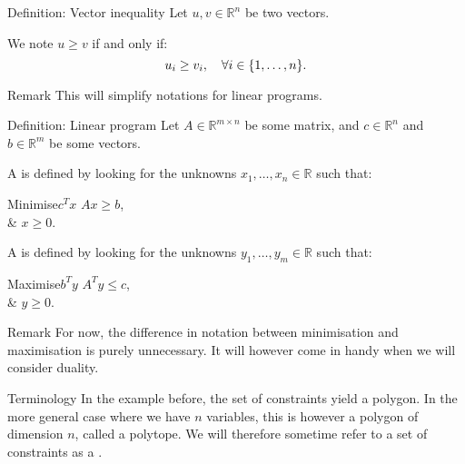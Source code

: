 \documentclass[a4paper]{article}
\begin{document}
\begin{parag}{Definition: Vector inequality}
    Let $u, v \in \mathbb{R}^n$ be two vectors.

    We note $u \geq v$ if and only if: 
    \[u_i \geq v_i, \mathspace \forall i \in \left\{1, \ldots, n\right\}.\]

    \begin{subparag}{Remark}
        This will simplify notations for linear programs.
    \end{subparag}
\end{parag}

\begin{parag}{Definition: Linear program}
    Let $A \in \mathbb{R}^{m \times n}$ be some matrix, and $c \in \mathbb{R}^{n}$ and $b \in \mathbb{R}^{m}$ be some vectors.

    A  is defined by looking for the unknowns $x_1, \ldots, x_n \in \mathbb{R}$ such that:
    \begin{linearprogram}{Minimise}{$c^T x$}
        $A x \geq b$, \\
        & $x \geq 0$.
    \end{linearprogram}

    A  is defined by looking for the unknowns $y_1, \ldots, y_m \in \mathbb{R}$ such that:
    \begin{linearprogram}{Maximise}{$b^T y$}
        $A^T y \leq c$, \\
        & $y \geq 0$.
    \end{linearprogram}

    \begin{subparag}{Remark}
        For now, the difference in notation between minimisation and maximisation is purely unnecessary. It will however come in handy when we will consider duality.
    \end{subparag}

    \begin{subparag}{Terminology}
        In the example before, the set of constraints yield a polygon. In the more general case where we have $n$ variables, this is however a polygon of dimension $n$, called a polytope. We will therefore sometime refer to a set of constraints as a .
    \end{subparag}
\end{parag}
\end{document}
